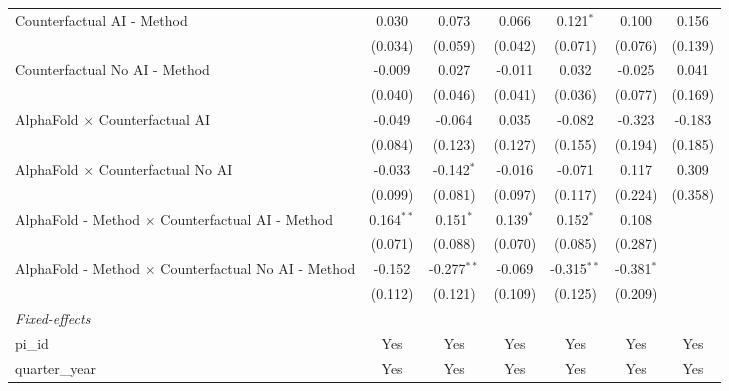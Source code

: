 \begin{tabular}{lcccccc}
   Counterfactual AI - Method                                 & 0.030        & 0.073         & 0.066       & 0.121$^{*}$   & 0.100        & 0.156\\   
                                                              & (0.034)      & (0.059)       & (0.042)     & (0.071)       & (0.076)      & (0.139)\\   
   Counterfactual No AI - Method                              & -0.009       & 0.027         & -0.011      & 0.032         & -0.025       & 0.041\\   
                                                              & (0.040)      & (0.046)       & (0.041)     & (0.036)       & (0.077)      & (0.169)\\   
   AlphaFold $\times$ Counterfactual AI                       & -0.049       & -0.064        & 0.035       & -0.082        & -0.323       & -0.183\\   
                                                              & (0.084)      & (0.123)       & (0.127)     & (0.155)       & (0.194)      & (0.185)\\   
   AlphaFold $\times$ Counterfactual No AI                    & -0.033       & -0.142$^{*}$  & -0.016      & -0.071        & 0.117        & 0.309\\   
                                                              & (0.099)      & (0.081)       & (0.097)     & (0.117)       & (0.224)      & (0.358)\\   
   AlphaFold - Method $\times$ Counterfactual AI - Method     & 0.164$^{**}$ & 0.151$^{*}$   & 0.139$^{*}$ & 0.152$^{*}$   & 0.108        &   \\   
                                                              & (0.071)      & (0.088)       & (0.070)     & (0.085)       & (0.287)      &   \\   
   AlphaFold - Method $\times$ Counterfactual No AI - Method  & -0.152       & -0.277$^{**}$ & -0.069      & -0.315$^{**}$ & -0.381$^{*}$ &   \\   
                                                              & (0.112)      & (0.121)       & (0.109)     & (0.125)       & (0.209)      &   \\   
   \midrule
   \emph{Fixed-effects}\\
   pi\_id                                                     & Yes          & Yes           & Yes         & Yes           & Yes          & Yes\\  
   quarter\_year                                              & Yes          & Yes           & Yes         & Yes           & Yes          & Yes\\  

\end{tabular}
